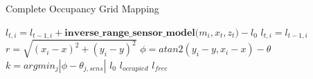 \documentclass[letterpaper]{article}
\begin{document}
\begin{algorithm}
	\caption{Complete Occupancy Grid Mapping}\label{OGM}
	\begin{algorithmic}[1]
		\State $l_{t,i} = l_{t-1,i} + \textbf{inverse\_range\_sensor\_model(}m_i, x_t, z_t\textbf{)}-l_0$
		\Else
		\State $l_{t,i} = l_{t-1,i}$
		\EndIf
		\EndFor 
		\EndProcedure
		\\
		\State $r = \sqrt{(x_i - x)^2 + (y_i - y)^2}$
		\State $\phi = atan2(y_i - y, x_i - x) - \theta$
		\State $k = argmin_j|\phi - \theta_{j, sens}|$
		\Return $l_0$
		\EndIf
		\Return $l_{occupied}$
		\EndIf
		\Return $l_{free}$
		\EndIf
		\EndProcedure
	\end{algorithmic}
\end{algorithm}
\end{document}
